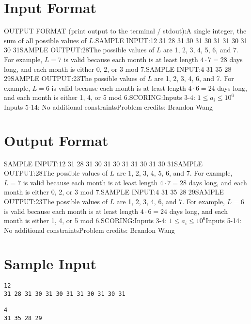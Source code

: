 \documentclass[12pt]{article}
\begin{document}
\section*{Input Format}
OUTPUT FORMAT (print output to the terminal / stdout):A single integer, the sum of all possible values of $L$.SAMPLE INPUT:12
31 28 31 30 31 30 31 31 30 31 30 31SAMPLE OUTPUT:28The possible values of $L$ are 1, 2, 3, 4, 5, 6, and 7.  For example, $L=7$ is
valid because each month is at least length $4 \cdot 7 = 28$ days long, and each
month is either 0, 2, or 3 mod 7.SAMPLE INPUT:4
31 35 28 29SAMPLE OUTPUT:23The possible values of $L$ are 1, 2, 3, 4, 6, and 7. For example, $L=6$ is valid
because each month is at least length $4 \cdot 6 = 24$ days long, and each month
is either 1, 4, or 5 mod 6.SCORING:Inputs 3-4: $1 \leq a_i \leq 10^6$Inputs 5-14: No additional
constraintsProblem credits: Brandon Wang

\section*{Output Format}
SAMPLE INPUT:12
31 28 31 30 31 30 31 31 30 31 30 31SAMPLE OUTPUT:28The possible values of $L$ are 1, 2, 3, 4, 5, 6, and 7.  For example, $L=7$ is
valid because each month is at least length $4 \cdot 7 = 28$ days long, and each
month is either 0, 2, or 3 mod 7.SAMPLE INPUT:4
31 35 28 29SAMPLE OUTPUT:23The possible values of $L$ are 1, 2, 3, 4, 6, and 7. For example, $L=6$ is valid
because each month is at least length $4 \cdot 6 = 24$ days long, and each month
is either 1, 4, or 5 mod 6.SCORING:Inputs 3-4: $1 \leq a_i \leq 10^6$Inputs 5-14: No additional
constraintsProblem credits: Brandon Wang

\section*{Sample Input}
\begin{verbatim}
12
31 28 31 30 31 30 31 31 30 31 30 31

4
31 35 28 29
\end{verbatim}
\end{document}

